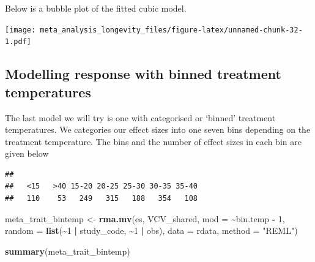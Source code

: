 \documentclass[
]{article}
\newenvironment{Shaded}{\begin{snugshade}}{\end{snugshade}}
\newcommand{\AttributeTok}[1]{\textcolor[rgb]{0.13,0.29,0.53}{#1}}
\newcommand{\DecValTok}[1]{\textcolor[rgb]{0.00,0.00,0.81}{#1}}
\newcommand{\FunctionTok}[1]{\textcolor[rgb]{0.13,0.29,0.53}{\textbf{#1}}}
\newcommand{\NormalTok}[1]{#1}
\newcommand{\OtherTok}[1]{\textcolor[rgb]{0.56,0.35,0.01}{#1}}
\newcommand{\SpecialCharTok}[1]{\textcolor[rgb]{0.81,0.36,0.00}{\textbf{#1}}}
\newcommand{\StringTok}[1]{\textcolor[rgb]{0.31,0.60,0.02}{#1}}
\begin{document}
\newpage

Below is a bubble plot of the fitted cubic model.

\texttt{[image: meta\_analysis\_longevity\_files/figure-latex/unnamed-chunk-32-1.pdf]}

\newpage

\hypertarget{modelling-response-with-binned-treatment-temperatures}{%
\subsection{Modelling response with binned treatment
temperatures}\label{modelling-response-with-binned-treatment-temperatures}}

The last model we will try is one with categorised or `binned' treatment
temperatures. We categories our effect sizes into one seven bins
depending on the treatment temperature. The bins and the number of
effect sizes in each bin are given below

\begin{Shaded}
\end{Shaded}

\begin{verbatim}
## 
##   <15   >40 15-20 20-25 25-30 30-35 35-40 
##   110    53   249   315   188   354   108
\end{verbatim}

\begin{Shaded}
\begin{Highlighting}[]
\NormalTok{meta\_trait\_bintemp }\OtherTok{\textless{}{-}} \FunctionTok{rma.mv}\NormalTok{(es, VCV\_shared, }\AttributeTok{mod =} \SpecialCharTok{\textasciitilde{}}\NormalTok{bin.temp }\SpecialCharTok{{-}}
    \DecValTok{1}\NormalTok{, }\AttributeTok{random =} \FunctionTok{list}\NormalTok{(}\SpecialCharTok{\textasciitilde{}}\DecValTok{1} \SpecialCharTok{|}\NormalTok{ study\_code, }\SpecialCharTok{\textasciitilde{}}\DecValTok{1} \SpecialCharTok{|}\NormalTok{ obs), }\AttributeTok{data =}\NormalTok{ rdata,}
    \AttributeTok{method =} \StringTok{"REML"}\NormalTok{)}
\end{Highlighting}
\end{Shaded}

\begin{Shaded}
\begin{Highlighting}[]
\FunctionTok{summary}\NormalTok{(meta\_trait\_bintemp)}
\end{Highlighting}
\end{Shaded}
\end{document}
